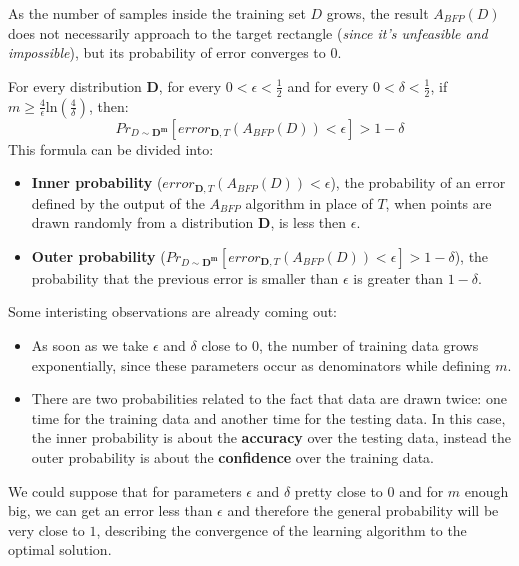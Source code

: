As the number of samples inside the training set $D$ grows, the result $A_{BFP}(D)$ does not necessarily approach to the target rectangle (\textit{since it's unfeasible
and impossible}), but its probability of error converges to $0$. 
\begin{definition}[title = Theorem]
    For every distribution $\boldsymbol{D}$, for every $0 < \epsilon < \frac{1}{2}$ and for every $0 < \delta < \frac{1}{2}$, if $m \geq \frac{4}{\epsilon}\text{ln}(\frac{4}{\delta})$,
    then:
    $$Pr_{D \sim \boldsymbol{D^m}} [error_{\boldsymbol{D}, T}(A_{BFP}(D)) < \epsilon] > 1 - \delta$$
    This formula can be divided into:
    \begin{itemize}
        \renewcommand{\labelitemi}{-}
        \item \textbf{Inner probability} ($error_{\boldsymbol{D}, T}(A_{BFP}(D)) < \epsilon$), the probability of an error defined by the output of the $A_ {BFP}$ algorithm in place of $T$, when points are drawn randomly from a distribution $\boldsymbol{D}$, is less then $\epsilon$.
        \item \textbf{Outer probability} ($Pr_{D \sim \boldsymbol{D^m}} [error_{\boldsymbol{D}, T}(A_{BFP}(D)) < \epsilon] > 1 - \delta$), the probability that the previous error is smaller than $\epsilon$ is greater than $1 - \delta$.
    \end{itemize} \vspace{3.5pt}
    Some interisting observations are already coming out:
    \begin{itemize}
        \renewcommand{\labelitemi}{-}
        \item As soon as we take $\epsilon$ and $\delta$ close to $0$, the number of training data grows exponentially, since these parameters occur as denominators while defining $m$.
        \item There are two probabilities related to the fact that data are drawn twice: one time for the training data and another time for the testing data. In this case, the inner probability is about the \textbf{accuracy} over the testing data, instead the outer probability is about the \textbf{confidence} over the training data.
    \end{itemize} \vspace{7pt}

    We could suppose that for parameters $\epsilon$ and $\delta$ pretty close to $0$ and for $m$ enough big, we can get an error less than $\epsilon$ and therefore the general probability
    will be very close to $1$, describing the convergence of the learning algorithm to the optimal solution.
\end{definition}